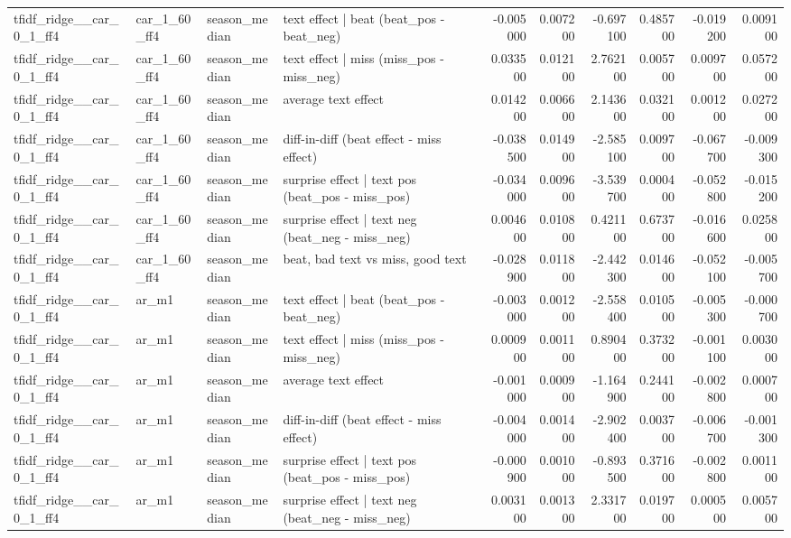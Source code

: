 \begin{table}
\begin{tabular}{llllrrrrrr}
tfidf\_ridge\_\_car\_0\_1\_ff4 & car\_1\_60\_ff4 & season\_median & text effect | beat  (beat\_pos - beat\_neg) & -0.005000 & 0.007200 & -0.697100 & 0.485700 & -0.019200 & 0.009100 \\
tfidf\_ridge\_\_car\_0\_1\_ff4 & car\_1\_60\_ff4 & season\_median & text effect | miss  (miss\_pos - miss\_neg) & 0.033500 & 0.012100 & 2.762100 & 0.005700 & 0.009700 & 0.057200 \\
tfidf\_ridge\_\_car\_0\_1\_ff4 & car\_1\_60\_ff4 & season\_median & average text effect & 0.014200 & 0.006600 & 2.143600 & 0.032100 & 0.001200 & 0.027200 \\
tfidf\_ridge\_\_car\_0\_1\_ff4 & car\_1\_60\_ff4 & season\_median & diff-in-diff (beat effect - miss effect) & -0.038500 & 0.014900 & -2.585100 & 0.009700 & -0.067700 & -0.009300 \\
tfidf\_ridge\_\_car\_0\_1\_ff4 & car\_1\_60\_ff4 & season\_median & surprise effect | text pos (beat\_pos - miss\_pos) & -0.034000 & 0.009600 & -3.539700 & 0.000400 & -0.052800 & -0.015200 \\
tfidf\_ridge\_\_car\_0\_1\_ff4 & car\_1\_60\_ff4 & season\_median & surprise effect | text neg (beat\_neg - miss\_neg) & 0.004600 & 0.010800 & 0.421100 & 0.673700 & -0.016600 & 0.025800 \\
tfidf\_ridge\_\_car\_0\_1\_ff4 & car\_1\_60\_ff4 & season\_median & beat, bad text vs miss, good text & -0.028900 & 0.011800 & -2.442300 & 0.014600 & -0.052100 & -0.005700 \\
tfidf\_ridge\_\_car\_0\_1\_ff4 & ar\_m1 & season\_median & text effect | beat  (beat\_pos - beat\_neg) & -0.003000 & 0.001200 & -2.558400 & 0.010500 & -0.005300 & -0.000700 \\
tfidf\_ridge\_\_car\_0\_1\_ff4 & ar\_m1 & season\_median & text effect | miss  (miss\_pos - miss\_neg) & 0.000900 & 0.001100 & 0.890400 & 0.373200 & -0.001100 & 0.003000 \\
tfidf\_ridge\_\_car\_0\_1\_ff4 & ar\_m1 & season\_median & average text effect & -0.001000 & 0.000900 & -1.164900 & 0.244100 & -0.002800 & 0.000700 \\
tfidf\_ridge\_\_car\_0\_1\_ff4 & ar\_m1 & season\_median & diff-in-diff (beat effect - miss effect) & -0.004000 & 0.001400 & -2.902400 & 0.003700 & -0.006700 & -0.001300 \\
tfidf\_ridge\_\_car\_0\_1\_ff4 & ar\_m1 & season\_median & surprise effect | text pos (beat\_pos - miss\_pos) & -0.000900 & 0.001000 & -0.893500 & 0.371600 & -0.002800 & 0.001100 \\
tfidf\_ridge\_\_car\_0\_1\_ff4 & ar\_m1 & season\_median & surprise effect | text neg (beat\_neg - miss\_neg) & 0.003100 & 0.001300 & 2.331700 & 0.019700 & 0.000500 & 0.005700 \\

\end{tabular}
\end{table}
